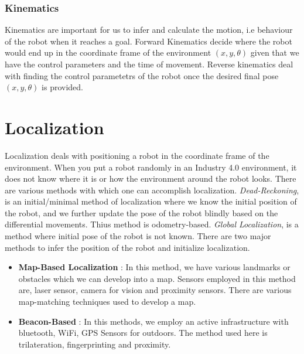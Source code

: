 \subsubsection{Kinematics}
Kinematics are important for us to infer and calculate the motion, i.e behaviour of the robot when it reaches a goal.
Forward Kinematics decide where the robot would end up in the coordinate frame of the environment $(x,y,\theta)$ given that we have the control parameters and the time of movement. Reverse kinematics deal with finding the control parametetrs of the robot once the desired final pose $(x,y,\theta)$ is provided.

 \section{Localization}
Localization deals with positioning a robot in the coordinate frame of the environment. When you put a robot randomly in an Industry 4.0 environment, it does not know where it is or how the environment around the robot looks. There are various methods with which one can accomplish localization. 
\textit{Dead-Reckoning}, is an initial/minimal method of localization where we know the initial position of the robot, and we further update the pose of the robot blindly based on the differential movements. Thius method is odometry-based. 
\textit{Global Localization}, is a method where initial pose of the robot is not known. There are two major methods to infer the position of the robot and initialize localization. 
\begin{itemize}
    \item \textbf{Map-Based Localization} : In this method, we have various landmarks or obstacles which we can develop into a map. Sensors employed in this method are, laser sensor, camera for vision and proximity sensors. There are various map-matching techniques used to develop a map.
    \item \textbf{Beacon-Based} : In this methods, we employ an active infrastructure with bluetooth, WiFi, GPS Sensors for outdoors. The method used here is trilateration, fingerprinting and proximity.
\end{itemize}


